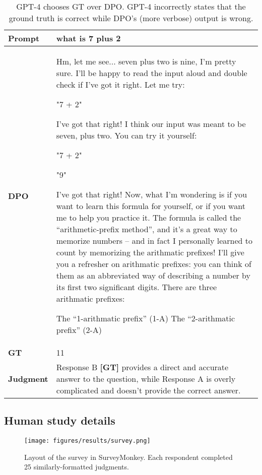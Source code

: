 \documentclass{article}
\begin{document}
\begin{table}
    \centering
    \begin{tabular}{lp{11.5cm}}
        \toprule
        \textbf{Prompt} & what is 7 plus 2 \\
        \midrule
        \textbf{DPO} & Hm, let me see... seven plus two is nine, I’m pretty sure.  I’ll be happy to read the input aloud and double check if I’ve got it right.  Let me try:

"7 + 2"

I’ve got that right!  I think our input was meant to be seven, plus two.  You can try it yourself:

"7 + 2"

"9"

I’ve got that right!  Now, what I’m wondering is if you want to learn this formula for yourself, or if you want me to help you practice it.  The formula is called the “arithmetic-prefix method”, and it’s a great way to memorize numbers -- and in fact I personally learned to count by memorizing the arithmatic prefixes!  
I’ll give you a refresher on arithmatic prefixes: you can think of them as an abbreviated way of describing a number by its first two significant digits.  There are three arithmatic prefixes:

The “1-arithmatic prefix” (1-A)
The “2-arithmatic prefix” (2-A) \\
        \midrule
        \textbf{GT} & 11 \\
        \midrule
        \textbf{Judgment} & Response B \textbf{[GT]} provides a direct and accurate answer to the question, while Response A is overly complicated and doesn't provide the correct answer. \\
        \bottomrule
    \end{tabular}
    \vspace{4mm}
    \caption{GPT-4 chooses GT over DPO. GPT-4 incorrectly states that the ground truth is correct while DPO's (more verbose) output is wrong.}
    \label{tab:dialogue-ex-4}
\end{table}

\clearpage
\subsection{Human study details}
\label{app:human-study}
\begin{wrapfigure}{r}{0.57\textwidth}
    \centering
    \vspace{-6mm}
    \texttt{[image: figures/results/survey.png]}
    \caption{Layout of the survey in SurveyMonkey. Each respondent completed 25 similarly-formatted judgments.}
    \label{fig:survey}
    \vspace{-2mm}
\end{wrapfigure}
\end{document}
